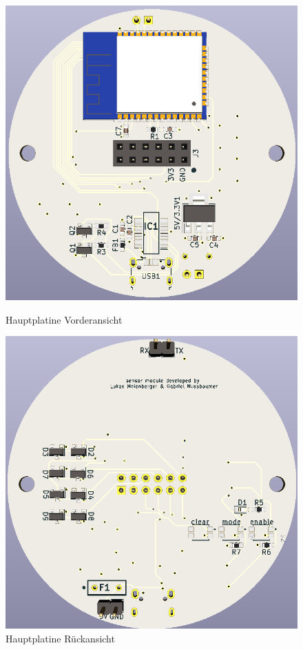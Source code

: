 \begin{figure}[h!]
	\centering
	\begin{minipage}[t]{0.4\linewidth}
		\centering
		\includegraphics[width=1\textwidth]{graphics/Hauptplatine_vorne.png}
		\caption{Hauptplatine Vorderansicht}
		\label{pic: Hauptplatine_vorne}
	\end{minipage}%
	\hfill
	\begin{minipage}[t]{0.4\linewidth}
		\centering
		\includegraphics[width=1\textwidth]{graphics/Hauptplatine_hinten.png}
		\caption{Hauptplatine Rückansicht}
		\label{pic: Hauptplatine_hinten}
	\end{minipage}
\end{figure}


